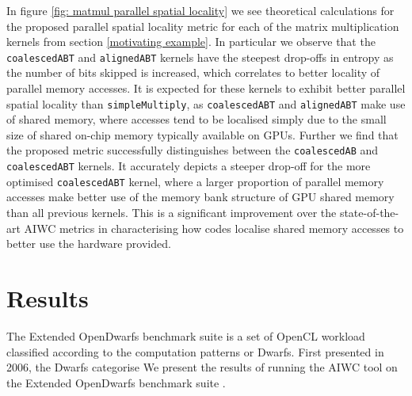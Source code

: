 \documentclass[review=false, sigchi]{acmart}
\begin{document}
	In figure \ref{fig: matmul parallel spatial locality} we see theoretical calculations for the proposed parallel spatial locality metric for each of the matrix multiplication kernels from section \ref{motivating example}. In particular we observe that the \texttt{coalescedABT} and \texttt{alignedABT} kernels have the steepest drop-offs in entropy as the number of bits skipped is increased, which correlates to better locality of parallel memory accesses. It is expected for these kernels to exhibit better parallel spatial locality than \texttt{simpleMultiply}, as \texttt{coalescedABT} and \texttt{alignedABT} make use of shared memory, where accesses tend to be localised simply due to the small size of shared on-chip memory typically available on GPUs. Further we find that the proposed metric successfully distinguishes between the \texttt{coalescedAB} and \texttt{coalescedABT} kernels. It accurately depicts a steeper drop-off for the more optimised \texttt{coalescedABT} kernel, where a larger proportion of parallel memory accesses make better use of the memory bank structure of GPU shared memory than all previous kernels. This is a significant improvement over the state-of-the-art AIWC metrics in characterising how codes localise shared memory accesses to better use the hardware provided.
	
	\section{Results}
	
	The Extended OpenDwarfs benchmark suite is a set of OpenCL workload classified according to the computation patterns or Dwarfs. First presented in 2006, the Dwarfs categorise 
	We present the results of running the AIWC tool on the Extended OpenDwarfs benchmark suite \cite{opendwarfs2017base,extendedopendwarfs}.
	
\end{document}
